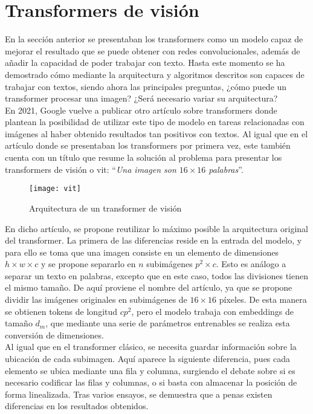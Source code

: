 		\section{Transformers de visión}
		
			En la sección anterior se presentaban los transformers como un modelo capaz de mejorar el resultado que se puede obtener con redes convolucionales, además de añadir la capacidad de poder trabajar con texto. Hasta este momento se ha demostrado cómo mediante la arquitectura y algoritmos descritos son capaces de trabajar con textos, siendo ahora las principales preguntas, ¿cómo puede un transformer procesar una imagen? ¿Será necesario variar su arquitectura?\\
			
			En 2021, Google vuelve a publicar otro artículo \cite{vit} sobre transformers donde plantean la posibilidad de utilizar este tipo de modelo en tareas relacionadas con imágenes al haber obtenido resultados tan positivos con textos. Al igual que en el artículo donde se presentaban los transformers por primera vez, este también cuenta con un título que resume la solución al problema para presentar los transformers de visión o \gls{vit}: ``\textit{Una imagen son $16 \times 16$ palabras}''. \\
			
			\begin{figure}[!h]
				\centering
				\texttt{[image: vit]}
				\caption{Arquitectura de un transformer de visión \cite{vit}}
				\label{fig:vit_arq}
			\end{figure}
			
			En dicho artículo, se propone reutilizar lo máximo posible la arquitectura original del transformer. La primera de las diferencias reside en la entrada del modelo, y para ello se toma que una imagen consiste en un elemento de dimensiones ${h \times w \times c}$ y se propone separarlo en $n$ subimágenes $p^2 \times c$. Esto es análogo a separar un texto en palabras, excepto que en este caso, todos las divisiones tienen el mismo tamaño. De aquí proviene el nombre del artículo, ya que se propone dividir las imágenes originales en subimágenes de $16 \times 16$ píxeles. De esta manera se obtienen tokens de longitud $cp^2$, pero el modelo trabaja con embeddings de tamaño $d_m$, que mediante una serie de parámetros entrenables se realiza esta conversión de dimensiones. \\
			
			Al igual que en el transformer clásico, se necesita guardar información sobre la ubicación de cada subimagen. Aquí aparece la siguiente diferencia, pues cada elemento se ubica mediante una fila y columna, surgiendo el debate sobre si es necesario codificar las filas y columnas, o si basta con almacenar la posición de forma linealizada. Tras varios ensayos, se demuestra que a penas existen diferencias en los resultados obtenidos. \\
			
